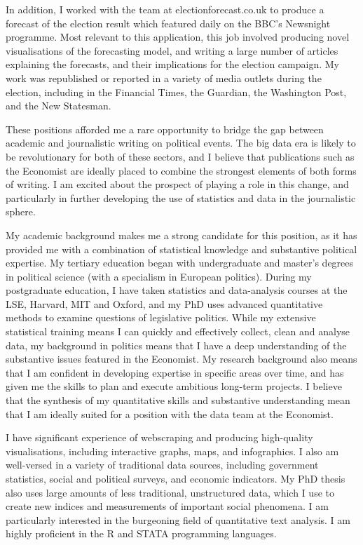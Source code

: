 \documentclass[11pt,a4paper,sans]{moderncv}        %
\begin{document}
In addition, I worked with the team at electionforecast.co.uk to produce a forecast of the election result which featured daily on the BBC's Newsnight programme. Most relevant to this application, this job involved producing novel visualisations of the forecasting model, and writing a large number of articles explaining the forecasts, and their implications for the election campaign. My work was republished or reported in a variety of media outlets during the election, including in the Financial Times, the Guardian, the Washington Post, and the New Statesman. 

These positions afforded me a rare opportunity to bridge the gap between academic and journalistic writing on political events. The big data era is likely to be revolutionary for both of these sectors, and I believe that publications such as the Economist are ideally placed to combine the strongest elements of both forms of writing. I am excited about the prospect of playing a role in this change, and particularly in further developing the use of statistics and data in the journalistic sphere.

My academic background makes me a strong candidate for this position, as it has provided me with a combination of statistical knowledge and substantive political expertise. My tertiary education began with undergraduate and master's degrees in political science (with a specialism in European politics). During my postgraduate education, I have taken statistics and data-analysis courses at the LSE, Harvard, MIT and Oxford, and my PhD uses advanced quantitative methods to examine questions of legislative politics. While my extensive statistical training means I can quickly and effectively collect, clean and analyse data, my background in politics means that I have a deep understanding of the substantive issues featured in the Economist. My research background also means that I am confident in developing expertise in specific areas over time, and has given me the skills to plan and execute ambitious long-term projects. I believe that the synthesis of my quantitative skills and substantive understanding mean that I am ideally suited for a position with the data team at the Economist. 

I have significant experience of webscraping and producing high-quality visualisations, including interactive graphs, maps, and infographics. I also am well-versed in a variety of traditional data sources, including government statistics, social and political surveys, and economic indicators. My PhD thesis also uses large amounts of less traditional, unstructured data, which I use to create new indices and measurements of important social phenomena. I am particularly interested in the burgeoning field of quantitative text analysis. I am highly proficient in the R and STATA programming languages. 
\end{document}
